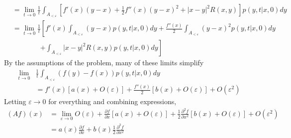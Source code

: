 \documentclass[12pt]{article}
\theoremstyle{plain}
\theoremstyle{definition}
\theoremstyle{remark}
\begin{document}
\begin{enumerate}
\begin{align*}
      &= \lim_{t\rightarrow0} \frac{1}{t}
      \int_{A_{<\varepsilon}} \left[
        f'(x)(y-x)+\frac{1}{2}f''(x)(y-x)^2 + |x-y|^2R(x,y)
      \right]p(y,t|x,0) dy \\
      &= \lim_{t\rightarrow0} \frac{1}{t}
        \left[
         f'(x)\int_{A_{<\varepsilon}}
         (y-x) p(y,t|x,0) dy
        + \frac{f''(x)}{2} \int_{A_{<\varepsilon}}
          (y-x)^2 p(y,t|x,0) dy \right. \\
        & \qquad \qquad \left. +\int_{A_{<\varepsilon}}
          |x-y|^2R(x,y) p(y,t|x,0) dy
        \right]
    \end{align*}
    By the assumptions of the problem, many of these limits simplify
    \begin{align*}
      \lim_{t\rightarrow0} &\frac{1}{t}
        \int_{A_{<\varepsilon}} (f(y)-f(x))p(y,t|x,0) dy \\
      &=
        f'(x)\left[a(x) + O(\varepsilon)\right]
        + \frac{f''(x)}{2} [b(x)+O(\varepsilon)] + O(\varepsilon^2)
    \end{align*}
    Letting $\varepsilon\to 0$ for everything and combining expressions,
    \begin{align*}
      (Af)(x) &= \lim_{\varepsilon\to0}
        O(\varepsilon) +
        \frac{\partial f}{\partial x}\left[a(x) + O(\varepsilon)\right]
        + \frac{1}{2}\frac{\partial^2 f}{\partial x^2} [b(x)+O(\varepsilon)]
        + O(\varepsilon^2) \\
        &=
        a(x)\frac{\partial f}{\partial x}
        + b(x)\frac{1}{2}\frac{\partial^2 f}{\partial x^2}
    \end{align*}


\end{enumerate}
\end{document}
